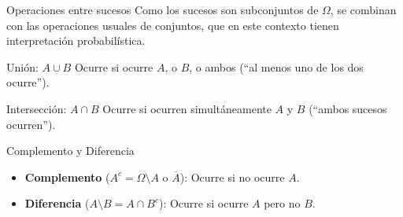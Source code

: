 \documentclass[aspectratio=169,11pt]{beamer}
\begin{document}
\begin{frame}{Operaciones entre sucesos}
Como los sucesos son subconjuntos de $\Omega$, se combinan con las operaciones usuales de conjuntos, que en este contexto tienen interpretación probabilística.

\begin{block}{Unión: $A \cup B$}
Ocurre si ocurre $A$, o $B$, o ambos (``al menos uno de los dos ocurre'').
\end{block}

\begin{block}{Intersección: $A \cap B$}
Ocurre si ocurren simultáneamente $A$ y $B$ (``ambos sucesos ocurren'').
\end{block}

\begin{block}{Complemento y Diferencia}
\begin{itemize}
\item \textbf{Complemento} ($A^c = \Omega \setminus A$ o $\overline{A}$): Ocurre si no ocurre $A$.
\item \textbf{Diferencia} ($A \setminus B = A \cap B^c$): Ocurre si ocurre $A$ pero no $B$.
\end{itemize}
\end{block}
\end{frame}
\end{document}
